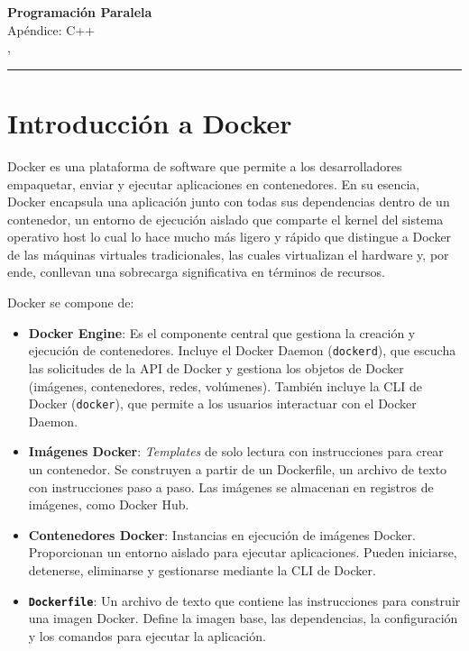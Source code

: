 



\begin{center}
    \LARGE\textbf{Programación Paralela} \\
    \Large{Apéndice: C++} \\
    \normalsize{\currentsemester, \currentyear} \\
    \vspace{1em}
    \hrule
\end{center}

\section{Introducción a Docker}

Docker es una plataforma de software que permite a los desarrolladores empaquetar, enviar y ejecutar aplicaciones en
contenedores. En su esencia, Docker encapsula una aplicación junto con todas sus dependencias dentro de un contenedor,
un entorno de ejecución aislado que comparte el kernel del sistema operativo host lo cual lo hace mucho más ligero y
rápido que distingue a Docker de las máquinas virtuales tradicionales, las cuales virtualizan el hardware y, por ende,
conllevan una sobrecarga significativa en términos de recursos.

Docker se compone de:

\begin{itemize}
  \item \textbf{Docker Engine}: Es el componente central que gestiona la creación y ejecución de contenedores. Incluye el
    Docker Daemon (\texttt{dockerd}), que escucha las solicitudes de la API de Docker y gestiona los objetos de Docker
    (imágenes, contenedores, redes, volúmenes). También incluye la CLI de Docker (\texttt{docker}), que permite a los
    usuarios interactuar con el Docker Daemon.

  \item \textbf{Imágenes Docker}: \textit{Templates} de solo lectura con instrucciones para crear un contenedor. Se
    construyen a partir de un Dockerfile, un archivo de texto con instrucciones paso a paso. Las imágenes se almacenan en
    registros de imágenes, como Docker Hub.

  \item \textbf{Contenedores Docker}: Instancias en ejecución de imágenes Docker. Proporcionan un entorno aislado para
    ejecutar aplicaciones. Pueden iniciarse, detenerse, eliminarse y gestionarse mediante la CLI de Docker.

  \item \textbf{\texttt{Dockerfile}}: Un archivo de texto que contiene las instrucciones para construir una imagen Docker.
    Define la imagen base, las dependencias, la configuración y los comandos para ejecutar la aplicación.
\end{itemize}

